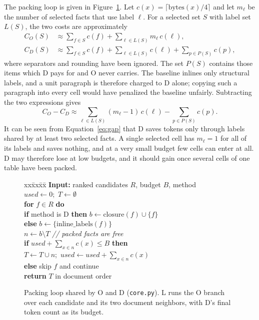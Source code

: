 \documentclass[11pt]{article}
\begin{document}
The packing loop is given in Figure~\ref{fig:algo}. Let $c(x)=\lceil\mathrm{bytes}(x)/4\rceil$
and let $m_\ell$ be the number of selected facts that use label $\ell$. For a selected
set $S$ with label set $L(S)$, the two costs are approximately
\begin{align}
C_O(S)&\approx\sum_{f\in S}c(f)+\sum_{\ell\in L(S)}m_\ell\,c(\ell),\\
C_D(S)&\approx\sum_{f\in S}c(f)+\sum_{\ell\in L(S)}c(\ell)+\sum_{p\in P(S)}c(p),
\end{align}
where separators and rounding have been ignored. The set $P(S)$ contains those items
which D pays for and O never carries. The baseline inlines only structural labels, and
a unit paragraph is therefore charged to D alone; copying such a paragraph into every
cell would have penalized the baseline unfairly. Subtracting the two expressions gives
\begin{equation}
C_O-C_D\approx\sum_{\ell\in L(S)}(m_\ell-1)\,c(\ell)-\sum_{p\in P(S)}c(p).
\label{eq:gap}
\end{equation}
It can be seen from Equation~\ref{eq:gap} that D saves tokens only through labels shared
by at least two selected facts. A single selected cell has $m_\ell=1$ for all of its
labels and saves nothing, and at a very small budget few cells can enter at all. D may
therefore lose at low budgets, and it should gain once several cells of one table have
been packed.

\begin{figure}[t]
\small
\begin{tabbing}
xx\=xx\=xx\=\kill
\textbf{Input:} ranked candidates $R$, budget $B$, method\\
$\mathit{used}\leftarrow 0$;\ $T\leftarrow\emptyset$\\
\textbf{for} $f\in R$ \textbf{do}\\
\>\textbf{if} method is D \textbf{then} $b\leftarrow\mathrm{closure}(f)\cup\{f\}$\\
\>\textbf{else} $b\leftarrow\{\mathrm{inline\_labels}(f)\}$\\
\>$n\leftarrow b\setminus T$ \qquad\textit{// packed facts are free}\\
\>\textbf{if} $\mathit{used}+\sum_{x\in n}c(x)\le B$ \textbf{then}\\
\>\>$T\leftarrow T\cup n$;\ $\mathit{used}\leftarrow\mathit{used}+\sum_{x\in n}c(x)$\\
\>\textbf{else} skip $f$ and continue\\
\textbf{return} $T$ in document order
\end{tabbing}
\vspace{-1em}
\caption{Packing loop shared by O and D (\texttt{core.py}). L runs the O branch over
each candidate and its two document neighbors, with D's final token count as
its budget.}
\label{fig:algo}
\end{figure}
\end{document}
